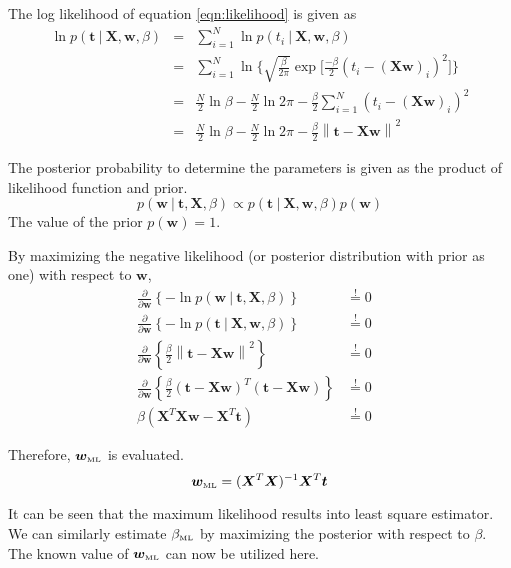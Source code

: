 \documentclass[11pt]{article}
\newcommand{\mle}[1]{{#1}_{\text{\tiny ML}}}
\newcommand\given[1][]{\:#1\vert\:}
\newcommand{\norm}[1]{\left\lVert#1\right\rVert}
\begin{document}
The log likelihood of equation \ref{eqn:likelihood} is given as 
\begin{eqnarray} \label{eqn:log_likelihood}
    \ln p(\bm{t} \given \bm{X}, \bm{w}, \beta) 
    &=&
    \sum_{i=1}^N \ln p(t_i \given \bm{X}, \bm{w}, \beta) \\
    &=&
    \sum_{i=1}^N \ln{\Big\{\sqrt{\frac{\beta}{2\pi}}\exp{\Big[\frac{-\beta}{2} \left(t_i - (\bm{X}\bm{w})_i\right)^2\Big]}\Big\}} \\
    &=&
    \frac{N}{2}\ln{\beta} - \frac{N}{2}\ln{2\pi} - \frac{\beta}{2} \sum_{i=1}^N \left(t_i - (\bm{X}\bm{w})_i\right)^2 \\
    &=&
    \frac{N}{2}\ln{\beta} - \frac{N}{2}\ln{2\pi} - \frac{\beta}{2} \norm{\bm{t} - \bm{Xw}}^2 
\end{eqnarray}

The posterior probability to determine the parameters is given as the product of likelihood function and prior.
\begin{equation} 
    p(\bm{w} \given \bm{t}, \bm{X}, \beta) \propto p(\bm{t} \given \bm{X}, \bm{w}, \beta) p(\bm{w})
\end{equation}
The value of the prior $p(\bm{w}) = 1$. 

By maximizing the negative likelihood (or posterior distribution with prior as one) with respect to $\bm{w}$,
\begin{eqnarray}
    \frac{\partial }{\partial  \bm{w}} \left\{ -\ln{p(\bm{w} \given \bm{t}, \bm{X}, \beta)} \right\} 
    &\overset{!}{=} 0& \\
    \frac{\partial }{\partial  \bm{w}} \left\{ -\ln{p(\bm{t} \given \bm{X}, \bm{w}, \beta)} \right\} 
    &\overset{!}{=} 0& \\
    \frac{\partial }{\partial \bm{w}} \left\{\frac{\beta}{2} \norm{\bm{t} - \bm{Xw}}^2  \right\}
    &\overset{!}{=} 0& \\
    \frac{\partial }{\partial \bm{w}} \left\{\frac{\beta}{2} \left(\bm{t} - \bm{X}\bm{w}\right)^T \left(\bm{t} - \bm{X}\bm{w}\right) \right\}
    &\overset{!}{=} 0& \\
    \beta \left( \bm{X}^T\bm{X}\bm{w} - \bm{X}^T \bm{t} \right) 
    &\overset{!}{=} 0& 
\end{eqnarray}

Therefore, $\mle{\bm{w}}$ is evaluated.
\begin{equation} \label{eqn:w_ML}
    \mle{\bm{w}} = (\bm{X}^T \bm{X})^{-1} \bm{X}^T \bm{t}
\end{equation}

It can be seen that the maximum likelihood results into least square estimator. We can similarly estimate $\mle{\beta}$ by maximizing the posterior with respect to $\beta$. The known value of $\mle{\bm{w}}$ can now be utilized here.
\end{document}
